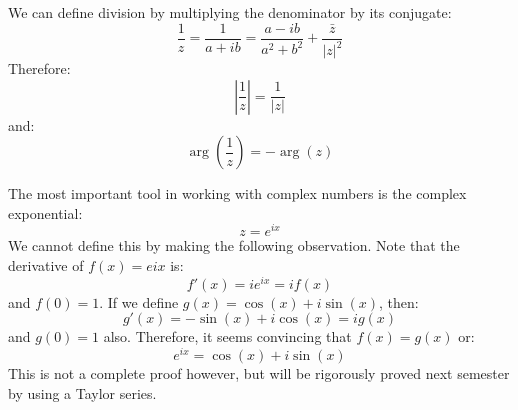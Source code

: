 \documentclass{article}
\begin{document}
    \begin{definition}
        We can define division by multiplying the denominator by its conjugate:
        \begin{equation}
            \frac{1}{z} = \frac{1}{a+ib} = \frac{a-ib}{a^2+b^2} + \frac{\bar{z}}{|z|^2}
            \label{eq:}
        \end{equation}
        Therefore:
        \begin{equation}
            \left|\frac{1}{z}\right| = \frac{1}{|z|}
            \label{eq:}
        \end{equation}
        and:
        \begin{equation}
            \arg\left(\frac{1}{z}\right) = - \arg(z)
            \label{eq:}
        \end{equation}
    \end{definition}
    The most important tool in working with complex numbers is the complex exponential:
    \begin{equation}
        z = e^{ix}
        \label{eq:}
    \end{equation}
    We cannot define this by making the following observation. Note that the derivative of $f(x)=e{ix}$ is:
    \begin{equation}
        f'(x) = ie^{ix} = if(x)
        \label{eq:}
    \end{equation}
    and $f(0)=1$. If we define $g(x)=\cos(x)+i\sin(x)$, then:
    \begin{equation}
        g'(x) = -\sin(x)+i\cos(x) = ig(x)
        \label{eq:}
    \end{equation}
    and $g(0)=1$ also. Therefore, it seems convincing that $f(x)=g(x)$ or:
    \begin{equation}
        e^{ix} = \cos(x)+i\sin(x)
        \label{eq:}
    \end{equation}
    This is not a complete proof however, but will be rigorously proved next semester by using a Taylor series.
\end{document}
